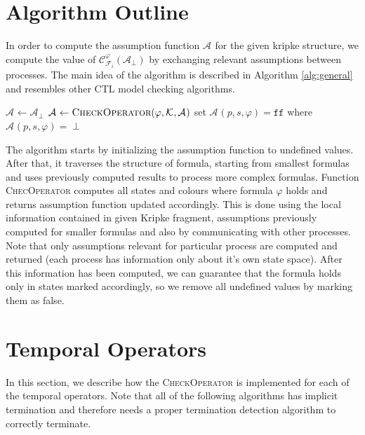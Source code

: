 \documentclass[12pt,oneside]{fithesis2}
\newcommand{\as}[1][]{\ensuremath{\mathcal{A}_{#1}}}
\newcommand{\asemt}{\as[\perp]}
\newcommand{\sem}{\ensuremath{\mathcal{C}_{\kf{i}{}}^\varphi}}
\newcommand{\method}[1]{\textnormal{\textsc{#1}}}
\newcommand{\false}{\ensuremath{\texttt{ff}}}
\newcommand{\ks}[1][]{\ensuremath{\mathcal{K}_{#1}}}
\newcommand{\kf}[2]{\ensuremath{\mathcal{F}^{#2}_{#1}}}
\newcommand{\fullKs}{\ensuremath{ \ks = (\params, S, S_0, \trans{}, L) }}
\newcommand{\trans}[1]{\stackrel{#1}{\rightarrow}}
\newcommand{\params}{\mathcal{P}}
\begin{document}
		\section{Algorithm Outline}
		
			In order to compute the assumption function $\as$ for the given kripke structure, we compute the value of $\sem(\asemt)$ by exchanging relevant assumptions between processes. The main idea of the algorithm is described in Algorithm \ref{alg:general} and resembles other CTL model checking algorithms.
			
			\begin{algorithm}
			\label{alg:general}
			\begin{algorithmic}[1]
				\Procedure{CheckCTL}{$ \psi, \fullKs $}
					\State $ \as \gets \asemt$ 
							\State $ \as \gets \Call{CheckOperator}{\varphi, \ks, \as } $
							\State set $\as(p, s, \varphi) = \false$ where $\as(p, s, \varphi) = \perp$
						\EndFor
					\EndFor
				\EndProcedure			
			\end{algorithmic} 
			\end{algorithm}
			
			The algorithm starts by initializing the assumption function to undefined values. After that, it traverses the structure of formula, starting from smallest formulas and uses previously computed results to process more complex formulas. Function \method{ChecOperator} computes all states and colours where formula $\varphi$ holds and returns assumption function updated accordingly. This is done using the local information contained in given Kripke fragment, assumptions previously computed for smaller formulas and also by communicating with other processes. Note that only assumptions relevant for particular process are computed and returned (each process has information only about it's own state space). After this information has been computed, we can guarantee that the formula holds only in states marked accordingly, so we remove all undefined values by marking them as false.
			
		\section{Temporal Operators}
    
    		In this section, we describe how the \method{CheckOperator} is implemented for each of the temporal operators. Note that all of the following algorithms has implicit termination and therefore needs a proper termination detection algorithm to correctly terminate.
    		
\end{document}
